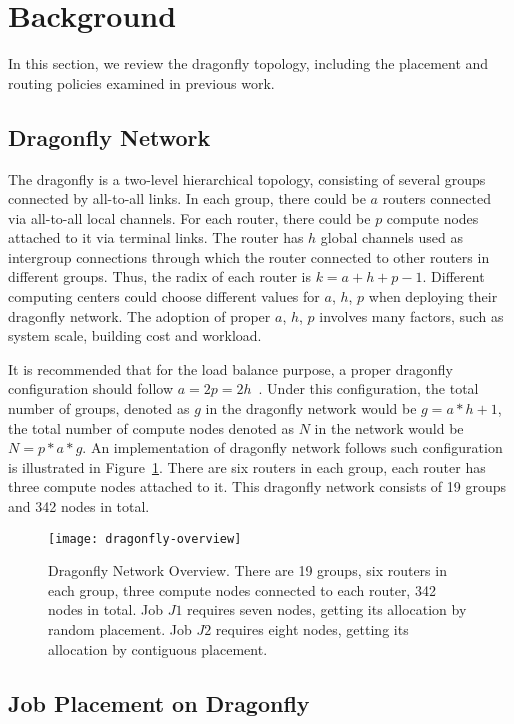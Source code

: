 
\section{Background}
\label{sec:background}

In this section, we review the dragonfly topology, including the placement and routing policies examined in previous work. 

\subsection{Dragonfly Network}
\label{sec:network}
The dragonfly is a two-level hierarchical topology, consisting of several groups connected by all-to-all links. In each group, there could be $a$ routers connected via all-to-all local channels. For each router, there could be $p$ compute nodes attached to it via terminal links. The router has $h$ global channels used as intergroup connections through which the router connected to other routers in different groups. Thus, the radix of each router is $k = a+h+p-1$. Different computing centers could choose different values for  $a$, $h$, $p$ when deploying their dragonfly network. The adoption of proper $a$, $h$, $p$ involves many factors, such as system scale, building cost and workload. 

It is recommended that for the load balance purpose, a proper dragonfly configuration should follow $a=2p=2h$~\cite{kim-micro}. Under this configuration, the total number of groups, denoted as $g$ in the dragonfly network would be $g = a*h+1 $, the total number of compute nodes denoted as $N$ in the network would be $N = p*a*g $. An implementation of dragonfly network follows such configuration is illustrated in Figure~\ref{fig:dragonfly-overview}. There are six routers in each group, each router has three compute nodes attached to it. This dragonfly network consists of 19 groups and 342 nodes in total.

\begin{figure}[h!] 
  \centering
  \texttt{[image: dragonfly-overview]}
  \caption{Dragonfly Network Overview. There are 19 groups, six routers in each group, three compute nodes connected to each router, 342 nodes in total. Job $J1$ requires seven nodes, getting its allocation by random placement. Job $J2$ requires eight nodes, getting its allocation by contiguous placement.}
  \label{fig:dragonfly-overview}
\end{figure}


\subsection{Job Placement on Dragonfly}
\label{sec:placement-schemes}

